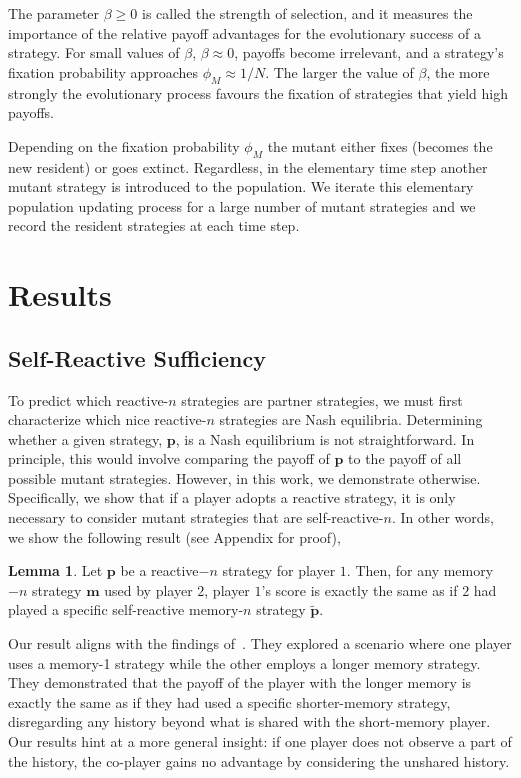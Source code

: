 \documentclass{article}
\theoremstyle{definition}
\newtheorem{lemma}[theorem]{Lemma}
\begin{document}
The parameter \(\beta \geq 0\) is called the strength of selection, and it
measures the importance of the relative payoff advantages for the
evolutionary success of a strategy. For small values of \(\beta\), \(\beta
\approx 0\), payoffs become irrelevant, and a strategy's fixation probability
approaches \(\phi_{M} \approx 1 / N\). The larger the value of \(\beta\), the
more strongly the evolutionary process favours the fixation of strategies that
yield high payoffs.

Depending on the fixation probability \(\phi_{M}\) the mutant either fixes
(becomes the new resident) or goes extinct. Regardless, in the elementary time
step another mutant strategy is introduced to the  population. We iterate this
elementary population updating process for a large number of mutant strategies
and we record the resident strategies at each time step.

\section{Results}

\subsection{Self-Reactive Sufficiency}

To predict which reactive-$n$ strategies are partner strategies, we must first
characterize which nice reactive-$n$ strategies are Nash equilibria. Determining
whether a given strategy, $\mathbf{p}$, is a Nash equilibrium is not
straightforward. In principle, this would involve comparing the payoff of
$\mathbf{p}$ to the payoff of all possible mutant strategies. However, in this
work, we demonstrate otherwise. Specifically, we show that if a player adopts a
reactive strategy, it is only necessary to consider mutant strategies that are
self-reactive-$n$. In other words, we show the following result (see Appendix for
proof),

\begin{lemma}\label{lemma:self_reactive_sufficiency}
  Let $\mathbf{p}$ be a reactive$-n$ strategy for player $1$. Then, for any
  memory$-n$ strategy $\mathbf{m}$ used by player $2$, player $1$'s score is
  exactly the same as if $2$ had played a specific self-reactive memory-$n$
  strategy $\mathbf{\tilde{p}}$.
\end{lemma}

Our result aligns with the findings of~\cite{press:PNAS:2012}. They explored a
scenario where one player uses a memory-1 strategy while the other employs a
longer memory strategy. They demonstrated that the payoff of the player with the
longer memory is exactly the same as if they had used a specific shorter-memory
strategy, disregarding any history beyond what is shared with the short-memory
player. Our results hint at a more general insight: if one player does not
observe a part of the history, the co-player gains no advantage by considering
the unshared history.
\end{document}
